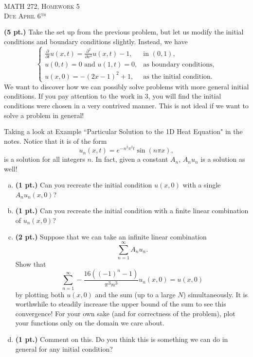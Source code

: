 \documentclass[12pt]{article} %
\begin{document}
\begin{center}
   \textsc{\large MATH 272, Homework 5}\\
   \textsc{Due April 6$^\textrm{th}$}
\end{center}
\vspace{.5cm}

\begin{problem}
\textbf{(5 pt.)} Take the set up from the previous problem, but let us modify the initial conditions and boundary conditions slightly. Instead, we have
\[
\begin{cases}
\frac{\partial}{\partial t} u(x,t) = \frac{\partial^2}{\partial x^2} u(x,t) - 1, & \textrm{in $(0,1)$},\\
u(0,t)=0 \textrm{~and~} u(1,t)=0, & \text{as boundary conditions},\\
u(x,0) = -(2x-1)^2+1, & \textrm{as the initial condition}.
\end{cases}
\]
We want to discover how we can possibly solve problems with more general initial conditions. If you pay attention to the work in 3, you will find the initial conditions were chosen in a very contrived manner. This is not ideal if we want to solve a problem in general!

Taking a look at Example ``Particular Solution to the 1D Heat Equation" in the notes. Notice that it is of the form
\[
u_n(x,t) = e^{-n^2\pi^2 t} \sin(n \pi x),
\]
is a solution for all integers $n$. In fact, given a constant $A_n$, $A_n u_n$ is a solution as well!
\begin{enumerate}[(a)]
    \item \textbf{(1 pt.)} Can you recreate the initial condition $u(x,0)$ with a single $A_n u_n(x,0)$?
    \item \textbf{(1 pt.)} Can you recreate the initial condition with a finite linear combination of $u_n(x,0)$?
    \item \textbf{(2 pt.)} Suppose that we can take an infinite linear combination
    \[
    \sum_{n=1}^\infty A_n u_n.
    \]
    Show that
    \[
    \sum_{n=1}^\infty -\frac{16\left(\left(-1\right)^{n}-1\right)}{\pi^{3}n^{3}}u_n(x,0) = u(x,0)
    \]
    by plotting both $u(x,0)$ and the sum (up to a large $N$) simultaneously. It is worthwhile to steadily increase the upper bound of the sum to see this convergence! For your own sake (and for correctness of the problem), plot your functions only on the domain we care about.
    \item \textbf{(1 pt.)} Comment on this. Do you think this is something we can do in general for any initial condition?
\end{enumerate}
\end{problem}
\end{document}
